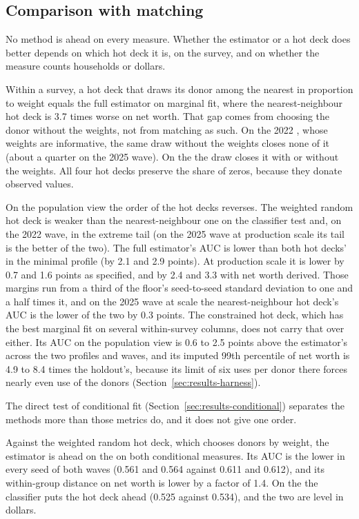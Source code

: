 \subsection{Comparison with matching}
\label{sec:discussion-matching}

No method is ahead on every measure. Whether the estimator or a hot deck
does better depends on which hot deck it is, on the survey, and on whether
the measure counts households or dollars.

Within a survey, a hot deck that draws its donor among the nearest in
proportion to weight equals the full estimator on marginal fit, where the
nearest-neighbour hot deck is 3.7 times worse on \scf{} net worth. That gap
comes from choosing the donor without the weights, not from matching as
such. On the 2022 \scf{}, whose weights are informative, the same draw
without the weights closes none of it (about a quarter on the 2025 wave). On
the \cps{} the draw closes it with or without the weights. All four hot
decks preserve the share of zeros, because they donate observed values.

On the population view the order of the hot decks reverses. The weighted
random hot deck is weaker than the nearest-neighbour one on the classifier
test and, on the 2022 wave, in the extreme tail (on the 2025 wave at
production scale its tail is the better of the two). The full estimator's
AUC is lower than both hot decks' in the minimal profile (by 2.1 and 2.9
points). At production scale it is lower by 0.7 and 1.6 points as specified,
and by 2.4 and 3.3 with net worth derived. Those margins run from a third of
the floor's seed-to-seed standard deviation to one and a half times it, and
on the 2025 wave at scale the nearest-neighbour hot deck's AUC is the lower
of the two by 0.3 points. The constrained hot deck, which has the best
marginal fit on several within-survey columns, does not carry that over
either. Its AUC on the population view is 0.6 to 2.5 points above the
estimator's across the two profiles and waves, and its imputed 99th
percentile of net worth is 4.9 to 8.4 times the holdout's, because its limit
of six uses per donor there forces nearly even use of the donors
(Section~\ref{sec:results-harness}).

The direct test of conditional fit
(Section~\ref{sec:results-conditional}) separates the methods more than
those metrics do, and it does not give one order.

Against the weighted random hot deck, which chooses donors by weight, the
estimator is ahead on the \scf{} on both conditional measures. Its AUC is the
lower in every seed of both waves (0.561 and 0.564 against 0.611 and 0.612),
and its within-group distance on net worth is lower by a factor of 1.4. On
the \cps{} the classifier puts the hot deck ahead (0.525 against 0.534), and
the two are level in dollars.

